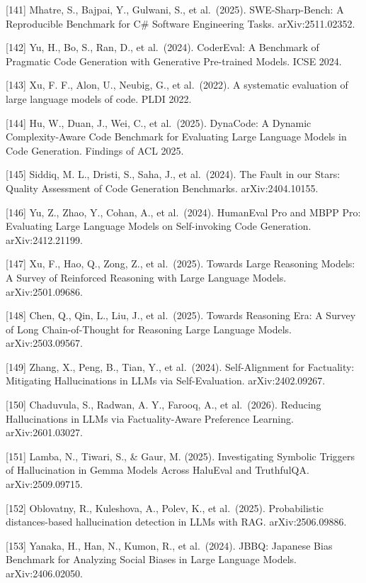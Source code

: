 {[}141{]} Mhatre, S., Bajpai, Y., Gulwani, S., et al.~(2025). SWE-Sharp-Bench: A Reproducible Benchmark for C\# Software Engineering Tasks. arXiv:2511.02352.

{[}142{]} Yu, H., Bo, S., Ran, D., et al.~(2024). CoderEval: A Benchmark of Pragmatic Code Generation with Generative Pre-trained Models. ICSE 2024.

{[}143{]} Xu, F. F., Alon, U., Neubig, G., et al.~(2022). A systematic evaluation of large language models of code. PLDI 2022.

{[}144{]} Hu, W., Duan, J., Wei, C., et al.~(2025). DynaCode: A Dynamic Complexity-Aware Code Benchmark for Evaluating Large Language Models in Code Generation. Findings of ACL 2025.

{[}145{]} Siddiq, M. L., Dristi, S., Saha, J., et al.~(2024). The Fault in our Stars: Quality Assessment of Code Generation Benchmarks. arXiv:2404.10155.

{[}146{]} Yu, Z., Zhao, Y., Cohan, A., et al.~(2024). HumanEval Pro and MBPP Pro: Evaluating Large Language Models on Self-invoking Code Generation. arXiv:2412.21199.

{[}147{]} Xu, F., Hao, Q., Zong, Z., et al.~(2025). Towards Large Reasoning Models: A Survey of Reinforced Reasoning with Large Language Models. arXiv:2501.09686.

{[}148{]} Chen, Q., Qin, L., Liu, J., et al.~(2025). Towards Reasoning Era: A Survey of Long Chain-of-Thought for Reasoning Large Language Models. arXiv:2503.09567.

{[}149{]} Zhang, X., Peng, B., Tian, Y., et al.~(2024). Self-Alignment for Factuality: Mitigating Hallucinations in LLMs via Self-Evaluation. arXiv:2402.09267.

{[}150{]} Chaduvula, S., Radwan, A. Y., Farooq, A., et al.~(2026). Reducing Hallucinations in LLMs via Factuality-Aware Preference Learning. arXiv:2601.03027.

{[}151{]} Lamba, N., Tiwari, S., \& Gaur, M. (2025). Investigating Symbolic Triggers of Hallucination in Gemma Models Across HaluEval and TruthfulQA. arXiv:2509.09715.

{[}152{]} Oblovatny, R., Kuleshova, A., Polev, K., et al.~(2025). Probabilistic distances-based hallucination detection in LLMs with RAG. arXiv:2506.09886.

{[}153{]} Yanaka, H., Han, N., Kumon, R., et al.~(2024). JBBQ: Japanese Bias Benchmark for Analyzing Social Biases in Large Language Models. arXiv:2406.02050.

